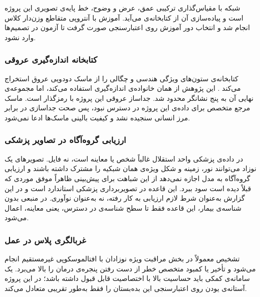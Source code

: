 شبکه  با مقیاس‌گذاری ترکیبی عمق، عرض و وضوح، خط پایه‌ی تصویری این پروژه است \cite{tan2019} و پیاده‌سازی آن از کتابخانه‌ی  می‌آید. آموزش با آنتروپی متقاطع وزن‌دار کلاس انجام شد و انتخاب دور آموزش روی  اعتبارسنجی صورت گرفت تا آزمون در تصمیم‌ها وارد نشود.

\subsubsection{کتابخانه اندازه‌گیری عروقی}

کتابخانه‌ی  ستون‌های ویژگی هندسی و چگالی را از ماسک دودویی عروق استخراج می‌کند \cite{fhima2022}. این پژوهش از همان خانواده‌ی اندازه‌گیری استفاده می‌کند، اما مجموعه‌ی نهایی آن به پنج نشانگر محدود شد. جداساز عروقی این پروژه  با رمزگذار  است. ماسک مرجع متخصص برای داده‌ی این پروژه در دسترس نبود، پس صحت جداسازی در برابر مرز انسانی سنجیده نشد و کیفیت بالینی ماسک‌ها ادعا نمی‌شود.

\subsubsection{ارزیابی گروه‌آگاه در تصاویر پزشکی}

در داده‌ی پزشکی واحد استقلال غالباً شخص یا معاینه است، نه فایل. تصویرهای یک نوزاد می‌توانند نور، زمینه و شکل ویژه‌ی همان شبکیه را مشترک داشته باشند و ارزیابی گروه‌آگاه به مدل اجازه نمی‌دهد از این شباهت برای پیش‌بینی ظاهراً موفق موردی که قبلاً دیده است سود ببرد. این قاعده در تصویربرداری پزشکی استاندارد است و در این گزارش به‌عنوان شرط لازم ارزیابی به کار رفته، نه به‌عنوان نوآوری. در منبعی بدون شناسه‌ی بیمار، این قاعده فقط تا سطح شناسه‌ی در دسترس، یعنی معاینه، اعمال می‌شود.

\subsubsection{غربالگری پلاس در عمل}

تشخیص  معمولاً در بخش مراقبت ویژه نوزادان با افتالموسکوپی غیرمستقیم انجام می‌شود و تأخیر یا کمبود متخصص خطر از دست رفتن پنجره‌ی درمان را بالا می‌برد. یک سامانه‌ی کمکی باید حساسیت بالا با اختصاصیت قابل قبول داشته باشد؛ در این پروژه آستانه‌ی یودن روی اعتبارسنجی این بده‌بستان را فقط به‌طور تقریبی متعادل می‌کند.

